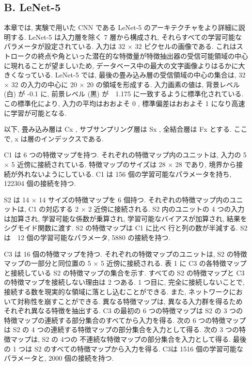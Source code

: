 \documentclass[twocolumn]{jarticle}     %
\begin{document}
 \subsection*{B. LeNet-5}
 本章では, 実験で用いた CNN である LeNet-5 のアーキテクチャをより詳細に説明する.
  LeNet-5 は入力層を除く 7 層から構成され, それらすべての学習可能なパラメータが設定されている. 入力は 32 × 32 ピクセルの画像である. これはストロークの終点や角といった潜在的な特徴量が特徴抽出器の受信可能領域の中心に現れることが望ましいため, データベース中の最大の文字画像よりはるかに大きくなっている. LeNet-5 では, 最後の畳み込み層の受信領域の中心の集合は, 32 × 32 の入力の中心に 20 × 20 の領域を形成する. 入力画素の値は, 背景レベル (白) が -0.1 に, 前景レベル (黒) が　1.175 に一致するように標準化されている.
  この標準化により, 入力の平均はおおよそ 0 , 標準偏差はおおよそ 1 になり高速に学習が可能となる.
  \par
  以下, 畳み込み層は Cx , サブサンプリング層は Sx , 全結合層は Fx とする. ここで, x は層のインデックスである.
  \par
  C1 は 6 つの特徴マップを持つ. それぞれの特徴マップ内のユニットは, 入力の 5 × 5 近傍に接続されている. 特徴マップのサイズは 28 × 28 であり, 境界から接続が外れないようにしている. C1 は 156 個の学習可能なパラメータを持ち, 122304 個の接続を持つ.
  \par
  S2 は 14 × 14 サイズの特徴マップを 6 個持つ. それぞれの特徴マップ内のユニットは, C1 の対応する 2 × 2 近傍に接続される. S2 内のユニットの 4 つの入力は加算され, 学習可能な係数が乗算され, 学習可能なバイアスが加算され, 結果をシグモイド関数に渡す. S2 の特徴マップは C1 に比べ 行と列の数が半減する. S2 は　12 個の学習可能なパラメータ, 5880 の接続を持つ.
  \par
  C3 は 16 個の特徴マップを持つ. それぞれの特徴マップのユニットは, S2 の特徴マップの一部分と同位置の 5 × 5 近傍に接続される.
  表 1 に C3 の各特徴マップと接続している S2 の特徴マップの集合を示す.
  すべての S2 の特徴マップと C3 の特徴マップを接続しない理由は 2 つある. 1 つ目に, 完全に接続しないことで, 接続する数を現実的な領域に落とし込むことができる. また, ネットワークにおいて対称性を崩すことができる. 異なる特徴マップは, 異なる入力群を得るためそれぞれ異なる特徴を抽出する.
  C3 の最初の 6 つの特徴マップは S2 の 3 つの特徴マップの連続する部分集合のすべてから入力を得る. 次の 6 つの特徴マップは S2 の 4 つの連続する特徴マップの部分集合を入力として得る. 次の 3 つの特徴マップは, S2 の 4つの 不連続な特徴マップの部分集合を入力として得る. 最後の 1 つは S2 のすべての特徴マップから入力を得る. C3は 1516 個の学習可能なパラメータと, 2000 個の接続を持つ.
\end{document}
